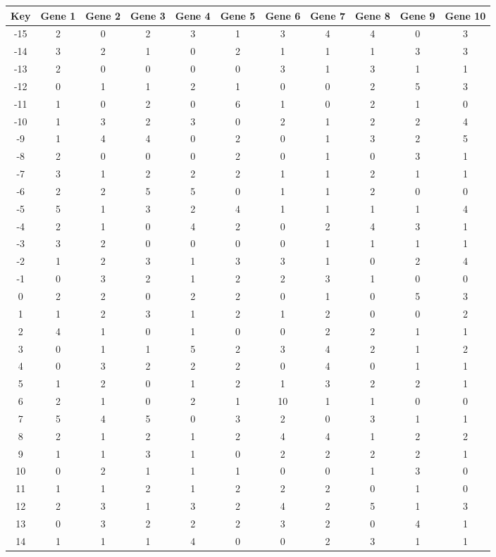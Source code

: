 \begin{tabular}{|c|c|c|c|c|c|c|c|c|c|c|}
\hline
Key & Gene 1 & Gene 2 & Gene 3 & Gene 4 & Gene 5 & Gene 6 & Gene 7 & Gene 8 & Gene 9 & Gene 10 \\
\hline
-15 & 2 & 0 & 2 & 3 & 1 & 3 & 4 & 4 & 0 & 3 \\
-14 & 3 & 2 & 1 & 0 & 2 & 1 & 1 & 1 & 3 & 3 \\
-13 & 2 & 0 & 0 & 0 & 0 & 3 & 1 & 3 & 1 & 1 \\
-12 & 0 & 1 & 1 & 2 & 1 & 0 & 0 & 2 & 5 & 3 \\
-11 & 1 & 0 & 2 & 0 & 6 & 1 & 0 & 2 & 1 & 0 \\
-10 & 1 & 3 & 2 & 3 & 0 & 2 & 1 & 2 & 2 & 4 \\
-9 & 1 & 4 & 4 & 0 & 2 & 0 & 1 & 3 & 2 & 5 \\
-8 & 2 & 0 & 0 & 0 & 2 & 0 & 1 & 0 & 3 & 1 \\
-7 & 3 & 1 & 2 & 2 & 2 & 1 & 1 & 2 & 1 & 1 \\
-6 & 2 & 2 & 5 & 5 & 0 & 1 & 1 & 2 & 0 & 0 \\
-5 & 5 & 1 & 3 & 2 & 4 & 1 & 1 & 1 & 1 & 4 \\
-4 & 2 & 1 & 0 & 4 & 2 & 0 & 2 & 4 & 3 & 1 \\
-3 & 3 & 2 & 0 & 0 & 0 & 0 & 1 & 1 & 1 & 1 \\
-2 & 1 & 2 & 3 & 1 & 3 & 3 & 1 & 0 & 2 & 4 \\
-1 & 0 & 3 & 2 & 1 & 2 & 2 & 3 & 1 & 0 & 0 \\
0 & 2 & 2 & 0 & 2 & 2 & 0 & 1 & 0 & 5 & 3 \\
1 & 1 & 2 & 3 & 1 & 2 & 1 & 2 & 0 & 0 & 2 \\
2 & 4 & 1 & 0 & 1 & 0 & 0 & 2 & 2 & 1 & 1 \\
3 & 0 & 1 & 1 & 5 & 2 & 3 & 4 & 2 & 1 & 2 \\
4 & 0 & 3 & 2 & 2 & 2 & 0 & 4 & 0 & 1 & 1 \\
5 & 1 & 2 & 0 & 1 & 2 & 1 & 3 & 2 & 2 & 1 \\
6 & 2 & 1 & 0 & 2 & 1 & 10 & 1 & 1 & 0 & 0 \\
7 & 5 & 4 & 5 & 0 & 3 & 2 & 0 & 3 & 1 & 1 \\
8 & 2 & 1 & 2 & 1 & 2 & 4 & 4 & 1 & 2 & 2 \\
9 & 1 & 1 & 3 & 1 & 0 & 2 & 2 & 2 & 2 & 1 \\
10 & 0 & 2 & 1 & 1 & 1 & 0 & 0 & 1 & 3 & 0 \\
11 & 1 & 1 & 2 & 1 & 2 & 2 & 2 & 0 & 1 & 0 \\
12 & 2 & 3 & 1 & 3 & 2 & 4 & 2 & 5 & 1 & 3 \\
13 & 0 & 3 & 2 & 2 & 2 & 3 & 2 & 0 & 4 & 1 \\
14 & 1 & 1 & 1 & 4 & 0 & 0 & 2 & 3 & 1 & 1 \\
\hline
\end{tabular}